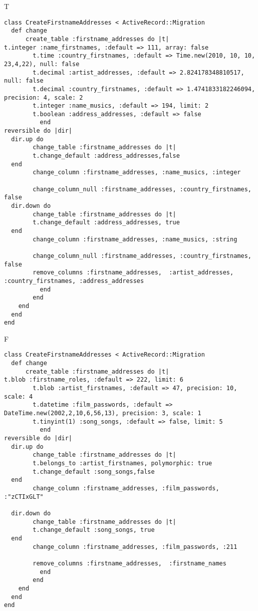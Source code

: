 T
\begin{verbatim}
class CreateFirstnameAddresses < ActiveRecord::Migration
  def change
	  create_table :firstname_addresses do |t|
t.integer :name_firstnames, :default => 111, array: false
		t.time :country_firstnames, :default => Time.new(2010, 10, 10, 23,4,22), null: false
		t.decimal :artist_addresses, :default => 2.824178348810517, null: false
		t.decimal :country_firstnames, :default => 1.4741833182246094, precision: 4, scale: 2
		t.integer :name_musics, :default => 194, limit: 2
		t.boolean :address_addresses, :default => false
		  end
reversible do |dir|
  dir.up do
		change_table :firstname_addresses do |t|
		t.change_default :address_addresses,false
  end
 		change_column :firstname_addresses, :name_musics, :integer
   
		change_column_null :firstname_addresses, :country_firstnames,  false
  dir.down do
		change_table :firstname_addresses do |t|
		t.change_default :address_addresses, true
  end
 		change_column :firstname_addresses, :name_musics, :string
   
		change_column_null :firstname_addresses, :country_firstnames, false
 		remove_columns :firstname_addresses,  :artist_addresses, :country_firstnames, :address_addresses 
	      end
	    end
    end 
  end
end

\end{verbatim}

F
\begin{verbatim}
class CreateFirstnameAddresses < ActiveRecord::Migration
  def change
	  create_table :firstname_addresses do |t|
t.blob :firstname_roles, :default => 222, limit: 6
		t.blob :artist_firstnames, :default => 47, precision: 10, scale: 4
		t.datetime :film_passwords, :default => DateTime.new(2002,2,10,6,56,13), precision: 3, scale: 1
		t.tinyint(1) :song_songs, :default => false, limit: 5
		  end
reversible do |dir|
  dir.up do
		change_table :firstname_addresses do |t|
		t.belongs_to :artist_firstnames, polymorphic: true
 		t.change_default :song_songs,false
  end
 		change_column :firstname_addresses, :film_passwords, :"zCTIxGLT"
   
  dir.down do
		change_table :firstname_addresses do |t|
		t.change_default :song_songs, true
  end
 		change_column :firstname_addresses, :film_passwords, :211
   
		remove_columns :firstname_addresses,  :firstname_names 
	      end
	    end
    end 
  end
end

\end{verbatim}

